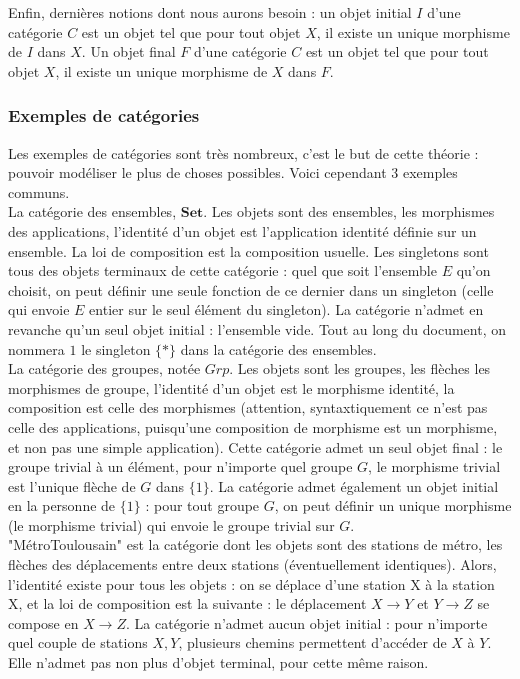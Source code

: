 \documentclass{article}
\begin{document}
Enfin, dernières notions dont nous aurons besoin : un objet initial $I$ d'une catégorie $C$
est un objet tel que pour tout objet $X$, il existe un unique morphisme de $I$ dans $X$. Un objet final $F$ d'une catégorie $C$ est un objet tel que pour tout objet $X$, il existe un unique morphisme de $ X$ dans $F$.

\subsubsection{Exemples de catégories}

Les exemples de catégories sont très nombreux, c'est le but de cette théorie : pouvoir modéliser le plus de choses possibles. Voici cependant 3 exemples communs. \\  
La catégorie des ensembles, $\mathbf{Set}$. Les objets sont des ensembles, les morphismes des applications, l'identité d'un objet est l'application identité définie sur un ensemble. La loi de composition est la composition usuelle. Les singletons sont tous des objets terminaux de cette catégorie : quel que soit l'ensemble $E$ qu'on choisit, on peut définir une seule fonction de ce dernier dans un singleton (celle qui envoie $E$ entier sur le seul élément du singleton). La catégorie n'admet en revanche qu'un seul objet initial : l'ensemble vide. Tout au long du document, on nommera $1$ le singleton $\{ * \} $ dans la catégorie des ensembles. 
\\ 
La catégorie des groupes, notée $Grp$. Les objets sont les groupes, les flèches les morphismes de groupe, l'identité d'un objet est le morphisme identité, la composition est celle des morphismes (attention, syntaxtiquement ce n'est pas celle des applications, puisqu'une composition de morphisme est un morphisme, et non pas une simple application). Cette catégorie admet un seul objet final : le groupe trivial à un élément, pour n'importe quel groupe $G$, le morphisme trivial est l'unique flèche de $G$ dans $\{ 1 \}$. La catégorie admet également un objet initial en la personne de $\{ 1 \}$ : pour tout groupe $G$, on peut définir un unique morphisme (le morphisme trivial) qui envoie le groupe trivial sur $G$.
\\ 
"MétroToulousain" est la catégorie dont les objets sont des stations de métro, les flèches des déplacements entre deux stations (éventuellement identiques). Alors, l'identité existe pour tous les objets : on se déplace d'une station X à la station X, et la loi de composition est la suivante :  le déplacement $X \rightarrow Y$ et $ Y \rightarrow Z$ se compose en $X \rightarrow Z$. La catégorie n'admet aucun objet initial : pour n'importe quel couple de stations $X,Y$, plusieurs chemins permettent d'accéder de $X$ à $Y$. Elle n'admet pas non plus d'objet terminal, pour cette même raison.
\end{document}
